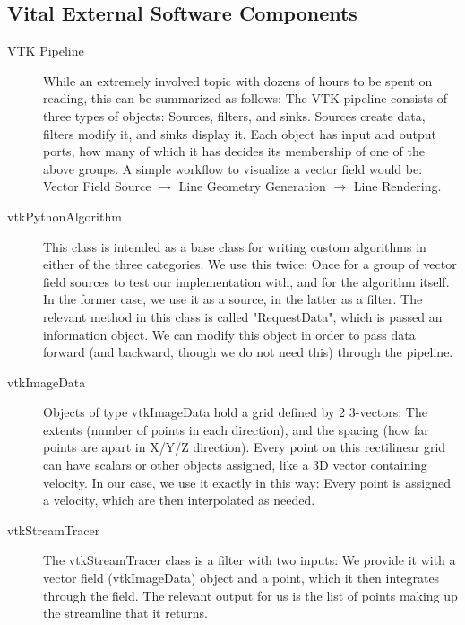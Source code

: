 \subsection{Vital External Software Components}
\begin{description}
    \item [VTK Pipeline] While an extremely involved topic with dozens of hours to be spent on reading, this can be summarized as follows:
    The VTK pipeline consists of three types of objects: Sources, filters, and sinks. Sources create data, filters modify it, and sinks display it.
    Each object has input and output ports, how many of which it has decides its membership of one of the above groups.
    A simple workflow to visualize a vector field would be: Vector Field Source $\rightarrow$ Line Geometry Generation $\rightarrow$ Line Rendering.
    \item [vtkPythonAlgorithm] This class is intended as a base class for writing custom algorithms in either of the three categories.
    We use this twice: Once for a group of vector field sources to test our implementation with, and for the algorithm itself.
    In the former case, we use it as a source, in the latter as a filter. The relevant method in this class is called "RequestData", which is passed an information object.
    We can modify this object in order to pass data forward (and backward, though we do not need this) through the pipeline.
    \item [vtkImageData] Objects of type vtkImageData hold a grid defined by 2 3-vectors: The extents (number of points in each direction), and the spacing (how far points are apart in X/Y/Z direction).
    Every point on this rectilinear grid can have scalars or other objects assigned, like a 3D vector containing velocity.
    In our case, we use it exactly in this way: Every point is assigned a velocity, which are then interpolated as needed.
    \item [vtkStreamTracer] The vtkStreamTracer class is a filter with two inputs: We provide it with a vector field (vtkImageData) object and a point, which it then integrates through the field.
    The relevant output for us is the list of points making up the streamline that it returns.
\end{description}

